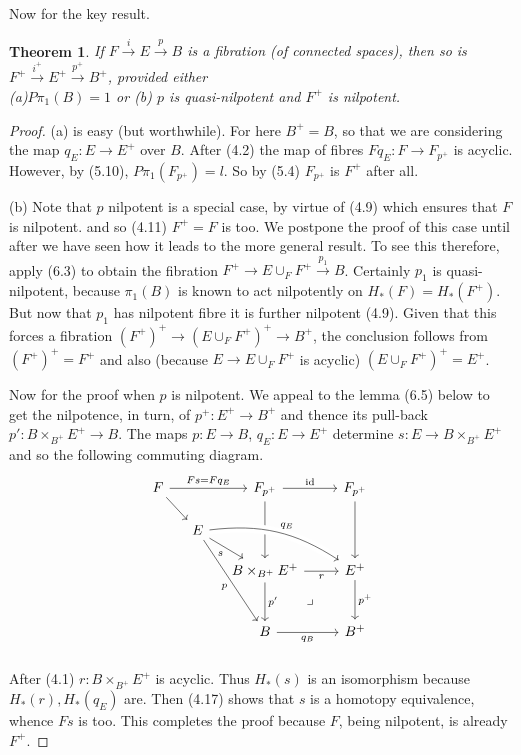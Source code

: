 \documentclass[openany,leqno]{book}  %
\newcommand{\id}{\mathrm{id}} %
\newtheorem{theorem}{Theorem}[chapter]
\begin{document}
Now for the key result.
\begin{theorem}
If $F\overset{i}{\longrightarrow} E\overset{p}{\longrightarrow} B$ is a fibration (of connected spaces), then so is $F^+\overset{i^+}{\longrightarrow} E^+\overset{p^+}{\longrightarrow} B^+$, provided either\\
(a)$P\pi_1 (B) = 1$ or
(b) $p$ is quasi-nilpotent and $F^+$ is nilpotent.
\end{theorem}
\begin{proof}
 (a) is easy (but worthwhile). For here $B^+ = B$, so that we are considering the map $q_E \colon   E \longrightarrow  E^+$ over $B$. After (4.2) the map of fibres $Fq_E \colon   F \longrightarrow F_{p^+}$ is acyclic. However, by (5.10), $P\pi_1(F_{p^+})=l$. So by (5.4) $F_{p^+}$ is $F^+$ after all. 

(b) Note that $p$ nilpotent is a special case, by virtue of (4.9) which ensures that $F$ is nilpotent. and so (4.11) $F^+ = F$ is too. We postpone the proof of this case until after we have seen how it leads to the more general result. To see this therefore, apply (6.3) to obtain the fibration $F^+ \longrightarrow  E\cup_F F^+ \overset{p_1}{\longrightarrow}  B$. Certainly $p_1$ is quasi-nilpotent, because $\pi_1(B)$ is known to act nilpotently on $H_*(F)= H_*(F^+)$. But now that $p_1$ has nilpotent fibre it is further nilpotent (4.9). Given that this forces a fibration $(F^+)^+\longrightarrow (E\cup_F F^+)^+ \longrightarrow  B^+$, the conclusion follows from $(F^+)^+ = F^+ $ and also (because $E \longrightarrow E\cup_F F^+$ is acyclic) $(E\cup_F F^+)^+ = E^+$.

Now for the proof when $p$ is nilpotent. We appeal to the lemma (6.5) below to get the nilpotence, in turn, of $p^+ \colon   E^+ \longrightarrow B^+$ and thence its pull-back $p' \colon   B\times_{B^+}E^+ \longrightarrow  B$. The maps $p \colon   E\longrightarrow  B$, $q_E\colon   E \longrightarrow E^+$ determine $s \colon   E \longrightarrow  B\times_{B^+}E^+$ and so the following commuting diagram.
\[
\begin{tikzcd}[row sep=scriptsize,column sep=small ]
F \arrow{rr}{Fs=Fq_E} \arrow{rd} &  & F_{p^+} \arrow{rr}{\id} \arrow[dd] & & F_{p^+} \arrow{dd}\\
      &E \arrow[rd,"s"'] \arrow[rddd,"p"']  \arrow[drrr,"q_E", crossing over, bend left=20]&  \\
      & & B\times_{B^+}E^+ \arrow[rr,"r"'] \arrow{dd}{p'} \arrow[ddrr, phantom, "\lrcorner"]&  & E^+ \arrow{dd}{p^+}\\
       \\
      & & B \arrow[rr,"q_B"']& & B^+ \\
\end{tikzcd}
\]
After (4.1) $r\colon   B\times_{B^+}E^+$ is acyclic. Thus $H_*(s)$ is an isomorphism because $H_*(r), H_*(q_E)$ are.
Then (4.17) shows that $s$ is a homotopy equivalence, whence $Fs$ is too. This completes the proof because $F$, being nilpotent, is already $F^+$.
 \end{proof}
\end{document}
